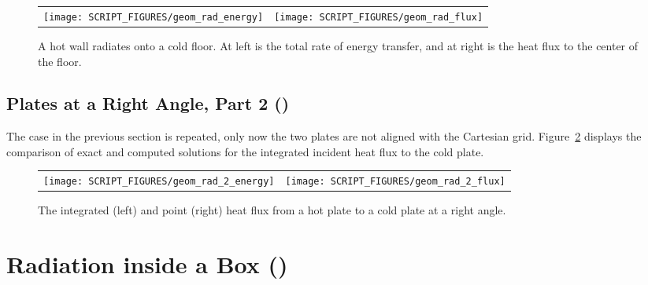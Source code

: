 \documentclass[11pt]{book}
\begin{document}
\begin{figure}[!ht]
\begin{tabular*}{\textwidth}{lr}
\texttt{[image: SCRIPT\_FIGURES/geom\_rad\_energy]} &
\texttt{[image: SCRIPT\_FIGURES/geom\_rad\_flux]}
\end{tabular*}
\caption[Results of the {\ct geom\_rad} test case]{A hot wall radiates onto a cold floor. At left is the total rate of energy transfer, and at right is the heat flux to the center of the floor.}
\label{geom_rad_fig}
\end{figure}

\subsection{Plates at a Right Angle, Part 2 (\texorpdfstring{}{geom\_rad\_2}) }
\label{geom_rad_2}

The case in the previous section is repeated, only now the two plates are not aligned with the Cartesian grid. Figure~\ref{geom_rad_2_fig} displays the comparison of exact and computed solutions for the integrated incident heat flux to the cold plate.

\begin{figure}[!ht]
\begin{tabular*}{\textwidth}{lr}
\texttt{[image: SCRIPT\_FIGURES/geom\_rad\_2\_energy]} &
\texttt{[image: SCRIPT\_FIGURES/geom\_rad\_2\_flux]}
\end{tabular*}
\caption[Results of the {\ct geom\_rad\_2} test case]{The integrated (left) and point (right) heat flux from a hot plate to a cold plate at a right angle.}
\label{geom_rad_2_fig}
\end{figure}



\section{Radiation inside a Box (\texorpdfstring{}{radiation\_box}) }
\label{radiation_in_a_box}
\label{radiation_box}
\end{document}
